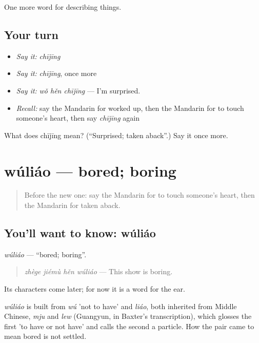\begin{grammarlens}[title={What you've built}]
One more word for describing things.
\end{grammarlens}

\subsection*{Your turn}
\begin{itemize}
\raggedright
  \item \emph{Say it:} \emph{chījīng}
  \item \emph{Say it:} \emph{chījīng}, once more
  \item \emph{Say it:} \emph{wǒ hěn chījīng} — I'm surprised.
  \item \emph{Recall:} say the Mandarin for worked up, then the Mandarin for to touch someone's heart, then say \emph{chījīng} again
\end{itemize}

\begin{tcolorbox}[breakable,colback=teal!4,colframe=teal!35!black,title={Before you move on}]
What does chījīng mean? (\textquotedblleft{}Surprised; taken aback\textquotedblright{}.) Say it once more.
\end{tcolorbox}
\section[wúliáo]{wúliáo — bored; boring}

\label{lesson:ZH-C271-wuliao}



\begin{quote}
Before the new one: say the Mandarin for to touch someone's heart, then the Mandarin for taken aback.
\end{quote}

\subsection*{You'll want to know: wúliáo}
\emph{wúliáo} — \textquotedblleft{}bored; boring\textquotedblright{}.

\begin{quote}
\emph{zhège jiémù hěn wúliáo} — This show is boring.
\end{quote}

Its characters come later; for now it is a word for the ear.

\begin{cousinweb}
\emph{wúliáo} is built from \emph{wú} 'not to have' and \emph{liáo}, both inherited from Middle Chinese, \emph{mju} and \emph{lew} (Guangyun, in Baxter's transcription), which glosses the first 'to have or not have' and calls the second a particle. How the pair came to mean bored is not settled.
\end{cousinweb}

